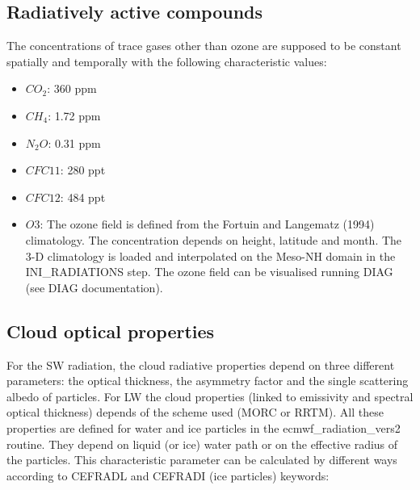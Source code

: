\subsection{Radiatively active compounds}

The concentrations of trace gases other than ozone are supposed to be constant spatially and temporally with the following characteristic values: 
\begin{itemize}
\item  $CO_{2}$: 360 ppm
\item  $CH_{4}$: 1.72 ppm
\item  $N_{2}O$: 0.31 ppm
\item  $CFC11$: 280 ppt
\item  $CFC12$: 484 ppt
\item  $O{3}$: The ozone field is defined from the Fortuin and Langematz (1994) climatology. The concentration depends on height, latitude and month. The 3-D climatology is loaded and interpolated on the Meso-NH domain in the INI\_RADIATIONS step. The ozone field can be visualised running DIAG (see DIAG documentation). 
\end{itemize}



\subsection{Cloud optical properties}\label{subsecoptical}
For the SW radiation, the cloud radiative properties depend on three different parameters: the optical thickness, the asymmetry factor and the single scattering albedo of particles. For LW the cloud properties (linked to emissivity and spectral optical thickness) depends of the scheme used (MORC or RRTM). All these properties are defined for water and ice particles in the ecmwf\_radiation\_vers2 routine. They depend on liquid (or ice) water path or on the effective radius of the particles. This characteristic parameter can be calculated by different ways according to CEFRADL and CEFRADI (ice particles) keywords:\\

